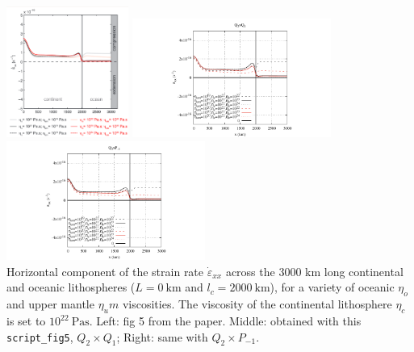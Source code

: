 \begin{center}
\includegraphics[width=4cm]{python_codes/fieldstone_143/images/fig5}
\includegraphics[width=6.5cm]{python_codes/fieldstone_143/results/fig5/fig5a}
\includegraphics[width=6.5cm]{python_codes/fieldstone_143/results/fig5_q2pm1/fig5a}\\
{\captionfont Horizontal component of the strain rate $\dot{\varepsilon}_{xx}$
across the 3000 km long continental and oceanic lithospheres
($L = 0~\si{\km}$ and $l_c = 2000~\si{\km}$), for a variety of
oceanic $\eta_o$ and upper mantle $\eta_um$ viscosities. The viscosity
of the continental lithosphere $\eta_c$ is set to $10^{22}~\si{\pascal\second}$.
Left: fig 5 from the paper. Middle: obtained with this  {\tt script\_fig5},
$Q_2\times Q_1$; Right: same with $Q_2\times P_{-1}$.}
\end{center}

